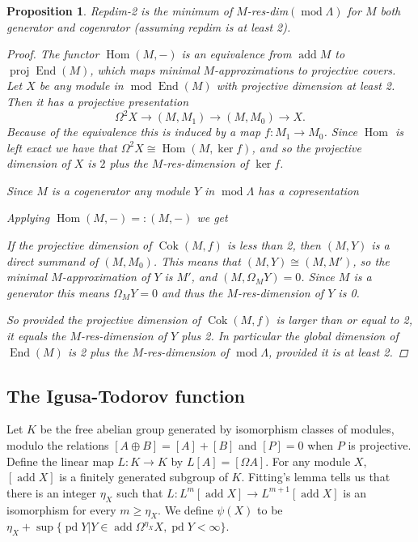 \documentclass[11pt, a4paper, english]{article}
\newtheorem{prop}[theorem]{Proposition}
\theoremstyle{definition}
\DeclareMathOperator{\Hom}{Hom}
\DeclareMathOperator{\End}{End}
\DeclareMathOperator{\cok}{Cok}
\DeclareMathOperator{\proj}{proj}
\DeclareMathOperator{\pd}{pd}
\DeclareMathOperator{\add}{add}
\def\mod{\operatorname{mod}}
\begin{document}
\begin{prop}
	Repdim-2 is the minimum of $M$-res-dim$(\mod \Lambda)$ for $M$ both generator and cogenrator (assuming repdim is at least 2).
	
	\begin{proof}
		The functor $\Hom(M, -)$ is an equivalence from $\add M$ to $\proj\End(M)$, which maps minimal $M$-approximations to projective covers. Let $X$ be any module in $\mod\End(M)$ with projective dimension at least 2. Then it has a projective presentation $$\Omega^2X \to (M,M_1) \to (M,M_0) \to X.$$
		Because of the equivalence this is induced by a map $f:M_1\to M_0$. Since $\Hom$ is left exact we have that $\Omega^2X \cong \Hom(M, \ker f)$, and so the projective dimension of $X$ is $2$ plus the $M$-res-dimension of $\ker f$.
		
		Since $M$ is a cogenerator any module $Y$ in $\mod\Lambda$ has a copresentation 
		\begin{center}
		\end{center}
		Applying $\Hom(M,-) =: (M,-)$ we get
		\begin{center}
		\end{center}
		If the projective dimension of $\cok(M,f)$ is less than 2, then $(M, Y)$ is a direct summand of $(M, M_0)$. This means that $(M,Y) \cong (M, M')$, so the minimal $M$-approximation of $Y$ is $M'$, and $(M, \Omega_M Y) = 0$. Since $M$ is a generator this means $\Omega_M Y = 0$ and thus the $M$-res-dimension of $Y$ is 0.
		
		So provided the projective dimension of $\cok(M,f)$ is larger than or equal to 2, it equals the $M$-res-dimension of $Y$ plus 2. In particular the global dimension of $\End(M)$ is 2 plus the $M$-res-dimension of $\mod\Lambda$, provided it is at least 2.
	\end{proof}
\end{prop}

\subsection{The Igusa-Todorov function}
Let $K$ be the free abelian group generated by isomorphism classes of modules, modulo the relations $[A\oplus B] = [A] + [B]$ and $[P]=0$ when $P$ is projective. Define the linear map $L:K\to K$ by $L[A] = [\Omega A]$. For any module $X$, $[\add X]$ is a finitely generated subgroup of $K$. Fitting's lemma tells us that there is an integer $\eta_X$ such that $L:L^m[\add X] \to L^{m+1}[\add X]$ is an isomorphism for every $m \geq \eta_X$. We define $\psi(X)$ to be $\eta_X + \sup\{\pd Y | Y \in \add \Omega^{\eta_X}X, \pd Y<\infty\}$.
\end{document}
